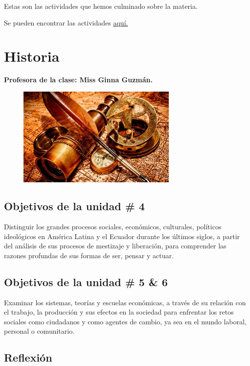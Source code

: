 \documentclass[a4paper, 12pt]{article}
\begin{document}
Estas son las actividades que hemos culminado sobre la materia.

Se pueden encontrar las actividades \href{https://drive.google.com/drive/folders/1h1XjvVwmMZPTBrb_DGk4VFDaQa4U9lXx?usp=sharing}{\underline{aquí.}}

\section{Historia}

\textbf{Profesora de la clase: Miss Ginna Guzmán.}

\begin{figure}[h]
  \includegraphics[width=0.7\textwidth, center]{historia.jpeg}
\end{figure}


\subsection{Objetivos de la unidad \# 4}

Distinguir los grandes procesos sociales, económicos, culturales, políticos
ideológicos en América Latina y el Ecuador durante los últimos siglos, a partir del análisis de sus procesos de mestizaje y liberación, para comprender las razones profundas de sus formas de ser, pensar y actuar.

\subsection{Objetivos de la unidad \# 5 \& 6}

Examinar los sistemas, teorías y escuelas económicas, a través de su relación con el trabajo, la producción y sus efectos en la sociedad para enfrentar los retos sociales como ciudadanos y como agentes de cambio, ya sea en el mundo laboral, personal o comunitario.

\subsection{Reflexión}
\end{document}
